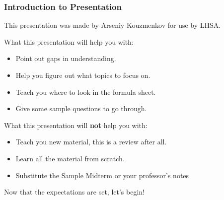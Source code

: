 \documentclass{beamer}
\begin{document}
    \begin{frame}
        \frametitle{Introduction to Presentation}
        
        This presentation was made by Arseniy Kouzmenkov for use by LHSA.\newline \pause

        What this presentation will help you with: 
        \begin{itemize}
            \item Point out gaps in understanding. \pause
            \item Help you figure out what topics to focus on. \pause
            \item Teach you where to look in the formula sheet. \pause
            \item Give some sample questions to go through. \pause
        \end{itemize}

        What this presentation will \textbf{not} help you with:
        \begin{itemize}
            \item Teach you new material, this is a review after all. \pause
            \item Learn all the material from scratch. \pause
            \item Substitute the Sample Midterm or your professor's notes \pause
        \end{itemize}

        Now that the expectations are set, let's begin!         
    \end{frame}
\end{document}
